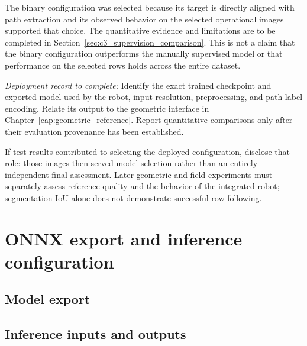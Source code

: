 The binary configuration was selected because its target is directly
aligned with path extraction and its observed behavior on the selected
operational images supported that choice. The quantitative evidence and
limitations are to be completed in
Section~\ref{sec:c3_supervision_comparison}. This is not a claim that the
binary configuration outperforms the manually supervised model or that
performance on the selected rows holds across the entire dataset.

\emph{Deployment record to complete:} Identify the exact trained checkpoint
and exported model used by the robot, input resolution, preprocessing,
and path-label encoding. Relate its output to the geometric interface in
Chapter~\ref{cap:geometric_reference}. Report quantitative comparisons
only after their evaluation provenance has been established.

If test results contributed to selecting the deployed configuration,
disclose that role: those images then served model selection rather than
an entirely independent final assessment. Later geometric and field
experiments must separately assess reference quality and the behavior
of the integrated robot; segmentation IoU alone does not demonstrate
successful row following.

\section{ONNX export and inference configuration}
\label{sec:c3_export_inference}

\subsection{Model export}
\label{subsec:c3_onnx_export}

\subsection{Inference inputs and outputs}
\label{subsec:c3_inference_interface}
\mbox{}\par